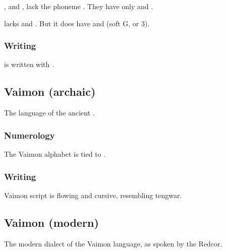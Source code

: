 \Tepharin, and \Ortaican, lack the phoneme \txipa{[v]}. 
They have only \txipa{[w]} and \txipa{[hw]}. 

\Tepharin{} lacks \txipa{[z]} and \txipa{[S]}.
But it does have \txipa{[D]} and \txipa{[3]} (soft G, or 3). 










\subsubsection{Writing}
\Tepharin{} is written with . 









\subsection{Vaimon (archaic)}
The language of the ancient . 









\subsubsection{Numerology}
The Vaimon alphabet is tied to . 





\subsubsection{Writing}
Vaimon script is flowing and cursive, resembling tengwar. 









\subsection{Vaimon (modern)}
The modern dialect of the Vaimon language, as spoken by the Redcor. 

